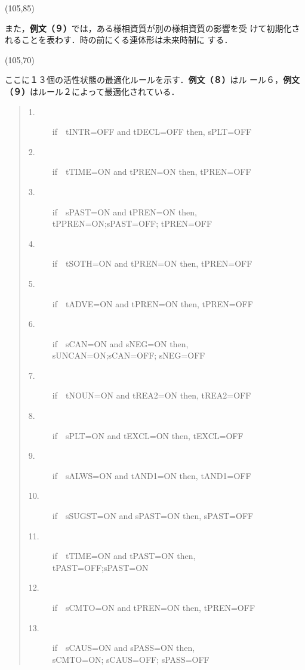 \clearpage
\vspace*{3mm}
\atari(105,85)
\vspace{5mm}

また，{\bf 例文（９）}では，ある様相資質が別の様相資質の影響を受
けて初期化されることを表わす．時の前にくる連体形は未来時制に
する．

\vspace{5mm}
\atari(105,70)
\vspace{5mm}

ここに１３個の活性状態の最適化ルールを示す．{\bf 例文（８）}はル
ール６，{\bf 例文（９）}はルール２によって最適化されている．

\vspace{3mm}
\begin{quote}
{\bf 
\begin{description}
\item[ 1.] if\ \ tINTR=OFF and tDECL=OFF  then, sPLT=OFF 
\item[ 2.] if\ \ tTIME=ON and tPREN=ON  then, tPREN=OFF 
\item[ 3.] if\ \ sPAST=ON and tPREN=ON  then,\\
\hspace*{4mm}tPPREN=ON;sPAST=OFF; tPREN=OFF
\item[ 4.] if\ \ tSOTH=ON and tPREN=ON  then, tPREN=OFF
\item[ 5.] if\ \ tADVE=ON and tPREN=ON  then, tPREN=OFF
\item[ 6.] if\ \ sCAN=ON and sNEG=ON  then,\\
\hspace*{4mm}sUNCAN=ON;sCAN=OFF; sNEG=OFF
\item[ 7.] if\ \ tNOUN=ON and tREA2=ON  then, tREA2=OFF
\item[ 8.] if\ \ sPLT=ON and tEXCL=ON  then, tEXCL=OFF
\item[ 9.] if\ \ sALWS=ON and tAND1=ON  then, tAND1=OFF
\item[10.] if\ \ sSUGST=ON and sPAST=ON  then, sPAST=OFF
\item[11.] if\ \ tTIME=ON and tPAST=ON  then,\\
\hspace*{4mm}tPAST=OFF;sPAST=ON
\item[12.] if\ \ sCMTO=ON and tPREN=ON  then, tPREN=OFF
\item[13.] if\ \ sCAUS=ON and sPASS=ON  then,\\
\hspace*{4mm}sCMTO=ON; sCAUS=OFF; sPASS=OFF
\end{description}
}
\end{quote}
\vspace{3mm}

